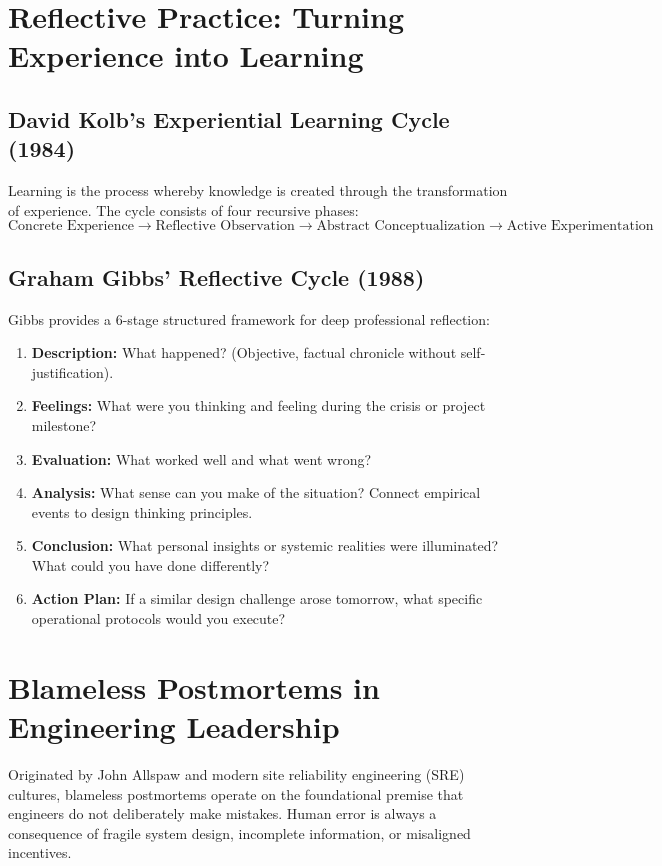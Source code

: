 \section{Reflective Practice: Turning Experience into Learning}

\subsection{David Kolb's Experiential Learning Cycle (1984)}
Learning is the process whereby knowledge is created through the transformation of experience. The cycle consists of four recursive phases:
\[
\text{Concrete Experience} \to \text{Reflective Observation} \to \text{Abstract Conceptualization} \to \text{Active Experimentation}
\]

\subsection{Graham Gibbs' Reflective Cycle (1988)}
Gibbs provides a 6-stage structured framework for deep professional reflection:
\begin{enumerate}[label=\textbf{\arabic*.}, leftmargin=1.5em]
    \item \textbf{Description:} What happened? (Objective, factual chronicle without self-justification).
    \item \textbf{Feelings:} What were you thinking and feeling during the crisis or project milestone?
    \item \textbf{Evaluation:} What worked well and what went wrong?
    \item \textbf{Analysis:} What sense can you make of the situation? Connect empirical events to design thinking principles.
    \item \textbf{Conclusion:} What personal insights or systemic realities were illuminated? What could you have done differently?
    \item \textbf{Action Plan:} If a similar design challenge arose tomorrow, what specific operational protocols would you execute?
\end{enumerate}

\section{Blameless Postmortems in Engineering Leadership}
Originated by John Allspaw and modern site reliability engineering (SRE) cultures, blameless postmortems operate on the foundational premise that engineers do not deliberately make mistakes. Human error is always a consequence of fragile system design, incomplete information, or misaligned incentives.

